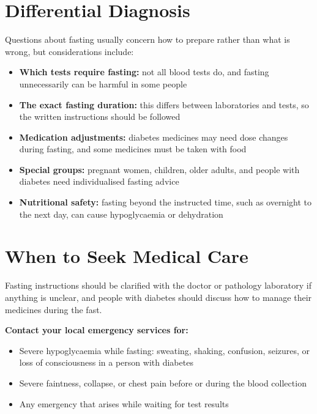\section*{Differential Diagnosis}
Questions about fasting usually concern how to prepare rather than what is wrong, but considerations include:
\begin{itemize}
    \item \textbf{Which tests require fasting:} not all blood tests do, and fasting unnecessarily can be harmful in some people
    \item \textbf{The exact fasting duration:} this differs between laboratories and tests, so the written instructions should be followed
    \item \textbf{Medication adjustments:} diabetes medicines may need dose changes during fasting, and some medicines must be taken with food
    \item \textbf{Special groups:} pregnant women, children, older adults, and people with diabetes need individualised fasting advice
    \item \textbf{Nutritional safety:} fasting beyond the instructed time, such as overnight to the next day, can cause hypoglycaemia or dehydration
\end{itemize}

\section*{When to Seek Medical Care}
Fasting instructions should be clarified with the doctor or pathology laboratory if anything is unclear, and people with diabetes should discuss how to manage their medicines during the fast.

\textbf{Contact your local emergency services for:}
\begin{itemize}
    \item Severe hypoglycaemia while fasting: sweating, shaking, confusion, seizures, or loss of consciousness in a person with diabetes
    \item Severe faintness, collapse, or chest pain before or during the blood collection
    \item Any emergency that arises while waiting for test results
\end{itemize}

